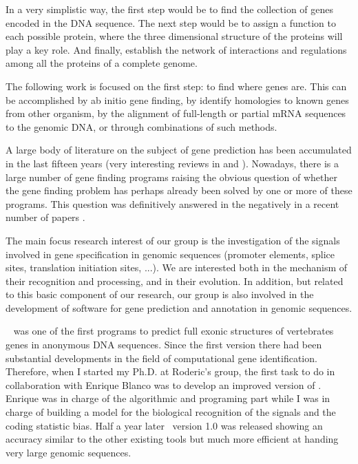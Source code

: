 \documentclass[11pt]{article}
\def\geneid{\texttt{geneid}}
\def\geneid{\bold{geneid}}
\begin{document}
In a very simplistic way, the first step would be to find the
collection of genes encoded in the DNA sequence. The next step would be
to assign a function to each possible protein, where the three dimensional
structure of the proteins will play a key role. And finally, establish
the network of interactions and regulations among all the proteins of
a complete genome.

The following work is focused on the first step: to find where genes are.
This can be accomplished by ab initio gene finding, by identify
homologies to known genes from other organism, by the alignment of
full-length or partial mRNA sequences to the genomic DNA, or through
combinations of such methods.

A large body of literature on the subject of gene prediction has been
accumulated in the last fifteen years (very interesting reviews
in \cite{burge:1998a} and \cite{stormo:2000a}). Nowadays, there is a
large number of gene finding programs raising the obvious question of
whether the gene finding problem has perhaps already been solved by
one or more of these programs. This question was definitively answered
in the negatively in a recent number of papers
\citep{guigo:2000c,rogic:2001a, guigo:2003a}.

The main focus research interest of our group is  the investigation
of the signals involved in gene specification in genomic sequences
(promoter elements, splice sites, translation initiation sites,
...). We are interested both in the mechanism of their recognition and
processing, and in their evolution. In addition, but related to this
basic component of our research, our group is also involved in the
development of software for gene prediction and annotation in genomic
sequences.

\geneid\ \citep{guigo:1992a} was one of the first programs to predict
full exonic structures of vertebrates genes in anonymous DNA
sequences. Since the first version there had been substantial
developments in the field of computational gene
identification. Therefore, when I started my Ph.D. at Roderic's group,
the first task to do in collaboration with Enrique Blanco was to
develop an improved version of \geneid. Enrique was in charge of the
algorithmic and programing part while I was in charge of building a
model for the biological recognition of the signals and the coding
statistic bias. Half a year later \geneid\ version 1.0 was released
showing an accuracy similar to the other existing tools but much more
efficient at handing very large genomic sequences.
\end{document}
